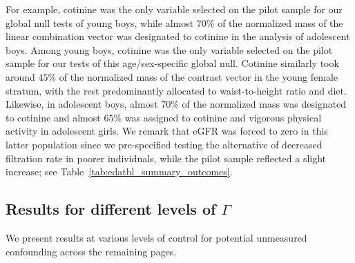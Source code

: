 \documentclass[12pt,leqno,titlepage]{amsart}
\newcommand{\1}{\mathbbm{1}}
\begin{document}
\begin{bibunit}
For example, cotinine was the only variable selected on the pilot sample for our global null tests of young boys,  while almost $70\%$ of the normalized mass of the linear combination vector was designated to cotinine in the analysis of adolescent boys. Among young boys, cotinine was the only variable selected on the pilot sample for our tests of this age/sex-specific global null. Cotinine similarly took around $45\%$ of the normalized mass of the contrast vector in the young female stratum, with the rest predominantly allocated to waist-to-height ratio and diet. Likewise, in adolescent boys, almost $70\%$ of the normalized mass was designated to cotinine and almost $65\%$ was assigned to cotinine and vigorous physical activity in adolescent girls. We remark that eGFR was forced to zero in this latter population since we pre-specified testing the alternative of decreased filtration rate in poorer individuals, while the pilot sample reflected a slight increase; see Table~\ref{tab:edatbl_summary_outcomes}.



\subsection{Results for different levels of $\Gamma$}

We present results at various levels of control for potential unmeasured confounding across the remaining pages.


\end{bibunit}
\end{document}
